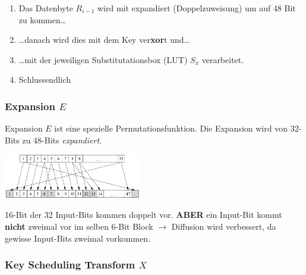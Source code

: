 \documentclass[
  10pt,
  a4paper,
]{article}
\providecommand{\tightlist}{%
  \setlength{\itemsep}{0pt}\setlength{\parskip}{0pt}}\usepackage{longtable,booktabs,array}
\begin{document}
\begin{multicols*}{2}
\begin{enumerate}
\def\labelenumi{\arabic{enumi}.}
\tightlist
\item
  Das Datenbyte \(R_{i-1}\) wird mit expandiert (Doppelzuweisung) um auf
  48 Bit zu kommen\ldots{}
\item
  \ldots danach wird dies mit dem Key ver\textbf{xor}t und\ldots{}
\item
  \ldots mit der jeweiligen Substitutationsbox (LUT) \(S_x\)
  verarbeitet.
\item
  Schlussendlich
\end{enumerate}

\subsubsection{\texorpdfstring{Expansion
\(E\)}{Expansion E}}\label{expansion-e}

Expansion \(E\) ist eine spezielle Permutationsfunktion. Die Expansion
wird von 32-Bits zu 48-Bits \emph{expandiert}.

\begin{center}
\includegraphics[width=6cm,height=\textheight]{images/crypto/expansion_function.png}
\end{center}

\begin{tcolorbox}[enhanced jigsaw, coltitle=black, toprule=.15mm, colframe=quarto-callout-important-color-frame, breakable, titlerule=0mm, title=\textcolor{quarto-callout-important-color}{\faExclamation}\hspace{0.5em}{Wichtig}, toptitle=1mm, colback=white, leftrule=.75mm, bottomtitle=1mm, colbacktitle=quarto-callout-important-color!10!white, left=2mm, bottomrule=.15mm, rightrule=.15mm, arc=.35mm, opacityback=0, opacitybacktitle=0.6]

16-Bit der 32 Input-Bits kommen doppelt vor. \textbf{ABER} ein Input-Bit
kommt \textbf{nicht} zweimal vor im selben 6-Bit Block \(\rightarrow\)
Diffusion wird verbessert, da gewisse Input-Bits zweimal vorkommen.

\end{tcolorbox}

\subsubsection{\texorpdfstring{Key Scheduling Transform
\(X\)}{Key Scheduling Transform X}}\label{key-scheduling-transform-x}


\end{multicols*}
\end{document}
